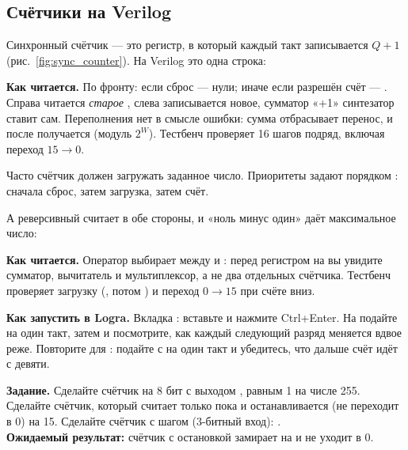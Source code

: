 \subsection{Счётчики на Verilog}
\label{sec:regs-cnt-v}

Синхронный счётчик --- это регистр, в который каждый такт записывается
$Q+1$ (рис.~\ref{fig:sync_counter}). На Verilog это одна строка:


\textbf{Как читается.} По фронту: если сброс --- нули; иначе если разрешён
счёт --- . Справа читается \emph{старое} ,
слева записывается новое, сумматор «+1» синтезатор ставит сам. Переполнения
нет в смысле ошибки: сумма отбрасывает перенос, и после  получается
 (модуль $2^W$). Тестбенч  проверяет 16 шагов
подряд, включая переход $15\to0$.

Часто счётчик должен загружать заданное число. Приоритеты задают порядком
: сначала сброс, затем загрузка, затем счёт.


А реверсивный считает в обе стороны, и «ноль минус один» даёт максимальное
число:


\textbf{Как читается.} Оператор  выбирает между
 и : перед регистром на  вы увидите
сумматор, вычитатель и мультиплексор, а не два отдельных счётчика. Тестбенч
проверяет загрузку (, потом ) и переход
$0\to15$ при счёте вниз.

\textbf{Как запустить в Logra.} Вкладка : вставьте
 и нажмите Ctrl+Enter. На  подайте
 на один такт, затем  и посмотрите, как каждый следующий
разряд меняется вдвое реже. Повторите для : подайте
 с  на один такт и убедитесь, что дальше счёт идёт с
девяти.

\begin{diybox}
\textbf{Задание.}  Сделайте счётчик на 8 бит с выходом ,
равным 1 на числе 255.  Сделайте счётчик, который считает только
пока  и останавливается (не переходит в 0) на 15. 
Сделайте счётчик с шагом  (3-битный вход): .\\
\textbf{Ожидаемый результат:} счётчик с остановкой замирает на  и
не уходит в 0.
\end{diybox}

